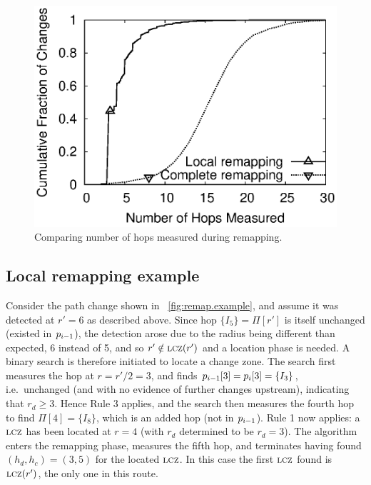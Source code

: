 \begin{figure}
\begin{minipage}{0.33\textwidth}
\includegraphics[width=1.05\textwidth]{figs/costhop.eps}
\caption{Comparing number of hops measured during remapping.}
\label{fig:sim.abs.cmp.hops}
\end{minipage}
\end{figure}


\subsection{Local remapping example}

Consider the path change shown in \figstr~\ref{fig:remap.example}, and
assume it was detected at $r'=6$ as described above.  Since hop $\{I_5\}
=\Pi[r']$ is itself unchanged (existed in $p_{i-1}$), the detection arose
due to the radius being different than expected, 6 instead of 5, and so
$r' \notin \mathrm{\textsc{lcz}}(r')$ and a location phase is needed.  A binary search is
therefore initiated to locate a change zone.  The search first measures
the hop at $r=r'/2=3$, and finds $p_{i-1}[3] = p_i[3] = \{I_3\}$,
i.e.~unchanged (and with no evidence of further changes upstream),
indicating that $r_d\ge3$.  Hence Rule 3 applies, and the search then measures
the fourth hop to find $\Pi[4] =\{I_8\}$, which is an added hop (not
in $p_{i-1}$).  Rule 1 now applies:  a $\mathrm{\textsc{lcz}}$ has been located at $r=4$
(with $r_d$ determined to be $r_d=3$).  The algorithm enters the
remapping phase, measures the fifth hop, and terminates having found
$(h_d,h_c)=(3,5)$ for the located $\mathrm{\textsc{lcz}}$.  In this case the first $\mathrm{\textsc{lcz}}$
found is $\mathrm{\textsc{lcz}}(r')$, the only one in this route.



